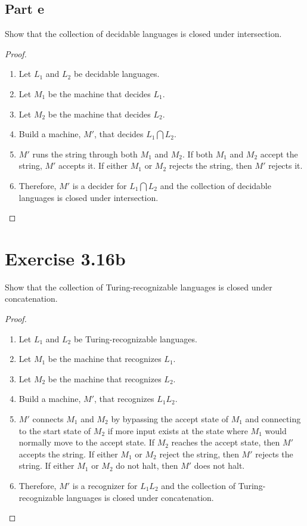 \documentclass{article}
\newcommand{\intersect}{\bigcap}
\begin{document}
\subsection{Part e}

Show that the collection of decidable languages is closed under intersection.

\begin{proof}
		\mbox{}
		\begin{enumerate}
		  \item Let $L_1$ and $L_2$ be decidable languages.
		  \item Let $M_1$ be the machine that decides $L_1$.
		  \item Let $M_2$ be the machine that decides $L_2$.
		  \item Build a machine, $M'$, that decides $L_1 \intersect L_2$.
		  \item $M'$ runs the string through both $M_1$ and $M_2$. If both $M_1$ and 
		  $M_2$ accept the string, $M'$ accepts it. If either $M_1$ or $M_2$ rejects
		  the string, then $M'$ rejects it.
		  \item Therefore, $M'$ is a decider for $L_1 \intersect L_2$ and the
		  collection of decidable languages is closed under intersection. \qedhere
		\end{enumerate}
\end{proof}

\section{Exercise 3.16b}

Show that the collection of Turing-recognizable languages is closed under
concatenation.

\begin{proof}
		\mbox{}
		\begin{enumerate}
		  \item Let $L_1$ and $L_2$ be Turing-recognizable languages.
		  \item Let $M_1$ be the machine that recognizes $L_1$.
		  \item Let $M_2$ be the machine that recognizes $L_2$.
		  \item Build a machine, $M'$, that recognizes $L_1 L_2$.
		  \item $M'$ connects $M_1$ and $M_2$ by bypassing the accept state of $M_1$
		  and connecting to the start state of $M_2$ if more input exists at the state
		  where $M_1$ would normally move to the accept state. If $M_2$ reaches the
		  accept state, then $M'$ accepts the string. If either $M_1$ or $M_2$ reject
		  the string, then $M'$ rejects the string. If either $M_1$ or $M_2$ do not
		  halt, then $M'$ does not halt.
		  \item Therefore, $M'$ is a recognizer for $L_1 L_2$ and the
		  collection of Turing-recognizable languages is closed under concatenation.
		  \qedhere
		\end{enumerate}
\end{proof}
\end{document}
